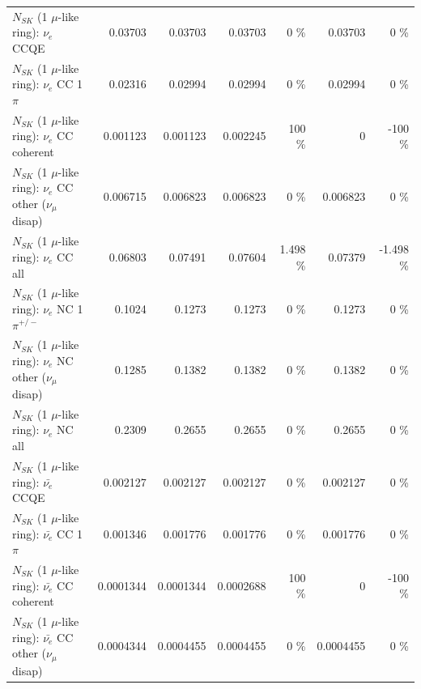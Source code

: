 \begin{table}
\begin{tabular}{| l | r | r | r  r | r  r |}
\hline
\hline
\hline
                                      $N_{SK}$ (1 $\mu$-like ring): $\nu_e$ CCQE &         0.03703 &         0.03703 &         0.03703 &        0 \%  &         0.03703 &        0 \%  \\ 
                                 $N_{SK}$ (1 $\mu$-like ring): $\nu_e$ CC 1$\pi$ &         0.02316 &         0.02994 &         0.02994 &        0 \%  &         0.02994 &        0 \%  \\ 
                               $N_{SK}$ (1 $\mu$-like ring): $\nu_e$ CC coherent &        0.001123 &        0.001123 &        0.002245 &      100 \%  &               0 &     -100 \%  \\ 
                $N_{SK}$ (1 $\mu$-like ring): $\nu_e$ CC other ($\nu_\mu$ disap) &        0.006715 &        0.006823 &        0.006823 &        0 \%  &        0.006823 &        0 \%  \\ 
                                  $N_{SK}$ (1 $\mu$-like ring): $\nu_{e}$ CC all &         0.06803 &         0.07491 &         0.07604 &    1.498 \%  &         0.07379 &   -1.498 \%  \\ 
\hline
                           $N_{SK}$ (1 $\mu$-like ring): $\nu_e$ NC 1$\pi^{+/-}$ &          0.1024 &          0.1273 &          0.1273 &        0 \%  &          0.1273 &        0 \%  \\ 
                $N_{SK}$ (1 $\mu$-like ring): $\nu_e$ NC other ($\nu_\mu$ disap) &          0.1285 &          0.1382 &          0.1382 &        0 \%  &          0.1382 &        0 \%  \\ 
                                  $N_{SK}$ (1 $\mu$-like ring): $\nu_{e}$ NC all &          0.2309 &          0.2655 &          0.2655 &        0 \%  &          0.2655 &        0 \%  \\ 
\hline
\hline
\hline
                                $N_{SK}$ (1 $\mu$-like ring): $\bar{\nu_e}$ CCQE &        0.002127 &        0.002127 &        0.002127 &        0 \%  &        0.002127 &        0 \%  \\ 
                           $N_{SK}$ (1 $\mu$-like ring): $\bar{\nu_e}$ CC 1$\pi$ &        0.001346 &        0.001776 &        0.001776 &        0 \%  &        0.001776 &        0 \%  \\ 
                         $N_{SK}$ (1 $\mu$-like ring): $\bar{\nu_e}$ CC coherent &       0.0001344 &       0.0001344 &       0.0002688 &      100 \%  &               0 &     -100 \%  \\ 
          $N_{SK}$ (1 $\mu$-like ring): $\bar{\nu_e}$ CC other ($\nu_\mu$ disap) &       0.0004344 &       0.0004455 &       0.0004455 &        0 \%  &       0.0004455 &        0 \%  \\ 

\end{tabular}
\end{table}

